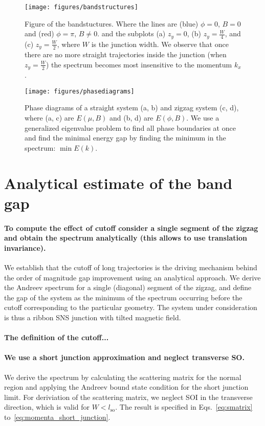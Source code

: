 \documentclass[english, twocolumn, 10pt, aps, superscriptaddress, floatfix, prb, citeautoscript]{revtex4-1}
\renewcommand{\comment}[2]{#2}
\renewcommand{\comment}{\paragraph}
\begin{document}
\begin{figure}[!htb]
\texttt{[image: figures/bandstructures]}
\caption{Figure of the bandstuctures.
Where the lines are (blue) $\phi=0$, $B=0$ and (red) $\phi=\pi$, $B \ne 0$.
and the subplots (a) $z_y=0$, (b) $z_y=\frac{W}{4}$, and (c) $z_y=\frac{W}{2}$, where $W$ is the junction width.
We observe that once there are no more straight trajectories inside the junction (when $z_y=\frac{W}{2}$) the spectrum becomes most insensitive to the momentum $k_x$.
\label{fig:bandstuctures}}
\end{figure}

\begin{figure}[!htb]
\texttt{[image: figures/phasediagrams]}
\caption{Phase diagrams of a straight system (a, b) and zigzag system (c, d), where (a, c) are $E(\mu, B)$ and (b, d) are $E(\phi, B)$.
We use a generalized eigenvalue problem to find all phase boundaries at once and find the minimal energy gap by finding the minimum in the spectrum: $\min{E(k)}$.
\label{fig:phasediagrams}}
\end{figure}

\section{Analytical estimate of the band gap}

\comment{To compute the effect of cutoff consider a single segment of the zigzag and obtain the spectrum analytically (this allows to use translation invariance).}
We establish that the cutoff of long trajectories is the driving mechanism behind the order of magnitude gap improvement using an analytical approach.
We derive the Andreev spectrum for a single (diagonal) segment of the zigzag, and define the gap of the system as the minimum of the spectrum occurring before the cutoff corresponding to the particular geometry.
The system under consideration is thus a ribbon SNS junction with tilted magnetic field.

\comment{The definition of the cutoff... }

\comment{We use a short junction approximation and neglect transverse SO.}
We derive the spectrum by calculating the scattering matrix for the normal region and applying the Andreev bound state condition for the short junction limit\cite{beenakker1991universal, sticlet_robustness_2017}. 
For deriviation of the scattering matrix, we neglect SOI in the transverse direction, which is valid for $W<l_\text{so}$.
The result is specified in Eqs.~\eqref{eq:smatrix} to~\eqref{eq:momenta_short_junction}.
\end{document}

